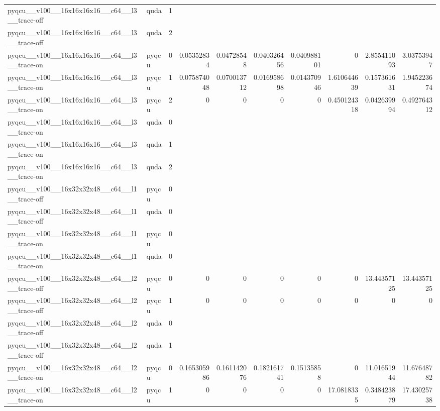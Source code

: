 \begin{table}[htbp]
\begin{tabular}{@{}llrrrrrrrr@{}}
pyqcu\_\_v100\_\_16x16x16x16\_\_c64\_\_l3\_\_trace-off & quda & 1 &  &  &  &  &  &  &  \\
pyqcu\_\_v100\_\_16x16x16x16\_\_c64\_\_l3\_\_trace-off & quda & 2 &  &  &  &  &  &  &  \\
pyqcu\_\_v100\_\_16x16x16x16\_\_c64\_\_l3\_\_trace-on & pyqcu & 0 & 0.05352834 & 0.04728548 & 0.040326456 & 0.040988101 & 0 & 2.855411093 & 3.03753947 \\
pyqcu\_\_v100\_\_16x16x16x16\_\_c64\_\_l3\_\_trace-on & pyqcu & 1 & 0.075874048 & 0.070013712 & 0.016958698 & 0.014370946 & 1.610644639 & 0.157361631 & 1.945223674 \\
pyqcu\_\_v100\_\_16x16x16x16\_\_c64\_\_l3\_\_trace-on & pyqcu & 2 & 0 & 0 & 0 & 0 & 0.450124318 & 0.042639994 & 0.492764312 \\
pyqcu\_\_v100\_\_16x16x16x16\_\_c64\_\_l3\_\_trace-on & quda & 0 &  &  &  &  &  &  &  \\
pyqcu\_\_v100\_\_16x16x16x16\_\_c64\_\_l3\_\_trace-on & quda & 1 &  &  &  &  &  &  &  \\
pyqcu\_\_v100\_\_16x16x16x16\_\_c64\_\_l3\_\_trace-on & quda & 2 &  &  &  &  &  &  &  \\
pyqcu\_\_v100\_\_16x32x32x48\_\_c64\_\_l1\_\_trace-off & pyqcu & 0 &  &  &  &  &  &  &  \\
pyqcu\_\_v100\_\_16x32x32x48\_\_c64\_\_l1\_\_trace-off & quda & 0 &  &  &  &  &  &  &  \\
pyqcu\_\_v100\_\_16x32x32x48\_\_c64\_\_l1\_\_trace-on & pyqcu & 0 &  &  &  &  &  &  &  \\
pyqcu\_\_v100\_\_16x32x32x48\_\_c64\_\_l1\_\_trace-on & quda & 0 &  &  &  &  &  &  &  \\
pyqcu\_\_v100\_\_16x32x32x48\_\_c64\_\_l2\_\_trace-off & pyqcu & 0 & 0 & 0 & 0 & 0 & 0 & 13.44357125 & 13.44357125 \\
pyqcu\_\_v100\_\_16x32x32x48\_\_c64\_\_l2\_\_trace-off & pyqcu & 1 & 0 & 0 & 0 & 0 & 0 & 0 & 0 \\
pyqcu\_\_v100\_\_16x32x32x48\_\_c64\_\_l2\_\_trace-off & quda & 0 &  &  &  &  &  &  &  \\
pyqcu\_\_v100\_\_16x32x32x48\_\_c64\_\_l2\_\_trace-off & quda & 1 &  &  &  &  &  &  &  \\
pyqcu\_\_v100\_\_16x32x32x48\_\_c64\_\_l2\_\_trace-on & pyqcu & 0 & 0.165305986 & 0.161142076 & 0.182161741 & 0.15135858 & 0 & 11.01651944 & 11.67648782 \\
pyqcu\_\_v100\_\_16x32x32x48\_\_c64\_\_l2\_\_trace-on & pyqcu & 1 & 0 & 0 & 0 & 0 & 17.0818335 & 0.348423879 & 17.43025738 \\

\end{tabular}
\end{table}
